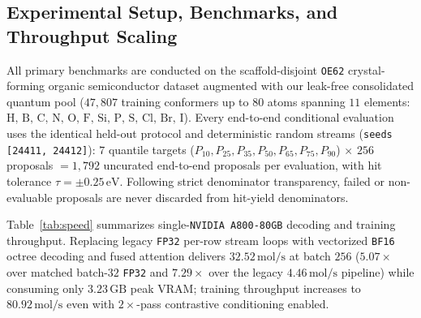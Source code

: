 \documentclass[11pt,a4paper]{article}
\begin{document}
\subsection{Experimental Setup, Benchmarks, and Throughput Scaling}
\label{sec:exp_setup}

All primary benchmarks are conducted on the scaffold-disjoint \texttt{OE62} crystal-forming organic semiconductor dataset \citep{stuke2020oe62} augmented with our leak-free consolidated quantum pool ($47{,}807$ training conformers up to $80$ atoms spanning $11$ elements: $\text{H, B, C, N, O, F, Si, P, S, Cl, Br, I}$). Every end-to-end conditional evaluation uses the identical held-out protocol and deterministic random streams (\texttt{seeds [24411, 24412]}): $7$ quantile targets ($P_{10}, P_{25}, P_{35}, P_{50}, P_{65}, P_{75}, P_{90}$) $\times$ $256$ proposals $= 1{,}792$ uncurated end-to-end proposals per evaluation, with hit tolerance $\tau = \pm 0.25\,\text{eV}$. Following strict denominator transparency, failed or non-evaluable proposals are never discarded from hit-yield denominators.

Table~\ref{tab:speed} summarizes single-\texttt{NVIDIA A800-80GB} decoding and training throughput. Replacing legacy \texttt{FP32} per-row stream loops with vectorized \texttt{BF16} octree decoding and fused attention delivers $32.52\,\text{mol/s}$ at batch $256$ ($5.07\times$ over matched batch-$32$ \texttt{FP32} and $7.29\times$ over the legacy $4.46\,\text{mol/s}$ pipeline) while consuming only $3.23\,\text{GB}$ peak VRAM; training throughput increases to $80.92\,\text{mol/s}$ even with $2\times$-pass contrastive conditioning enabled.
\end{document}
